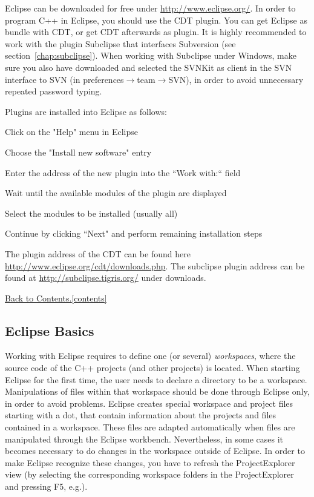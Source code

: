 \documentclass[11pt, oneside]{scrartcl}
\newcommand{\backtocontents}{\hyperref[contents]{Back to Contents.\ref*{contents}}}
\begin{document}
Eclipse can be downloaded for free under \url{http://www.eclipse.org/}. In order
to program C++ in Eclipse, you should use the CDT plugin. You can get Eclipse as
bundle with CDT, or get CDT afterwards as plugin. It is highly recommended to
work with the plugin Subclipse that interfaces Subversion (see
section~\ref{chap:subclipse}). When working with Subclipse under Windows, make
sure you also have downloaded and selected the SVNKit as client in the SVN
interface to SVN (in preferences$\rightarrow$team$\rightarrow$SVN), in order to 
avoid unnecessary repeated password typing.

Plugins are installed into Eclipse as follows:
\begin{enumerate*}
\item Click on the "Help" menu in Eclipse
\item Choose the "Install new software" entry
\item Enter the address of the new plugin into the ``Work with:`` field
\item Wait until the available modules of the plugin are displayed
\item Select the modules to be installed (usually all)
\item Continue by clicking ``Next" and perform remaining installation steps
\end{enumerate*}

\noindent The plugin address of the CDT can be found here
\url{http://www.eclipse.org/cdt/downloads.php}. The subclipse plugin address can
be found at \url{http://subclipse.tigris.org/} under downloads.
   
\backtocontents   
   
   
\subsection{Eclipse Basics}
    
Working with Eclipse requires to define one (or several) \textit{workspaces},
where the source code of the C++ projects (and other projects) is located. When
starting Eclipse for the first time, the user needs to declare a directory to be
a workspace. Manipulations of files within that workspace should be done through
Eclipse only, in order to avoid problems. Eclipse creates special workspace and
project files starting with a dot, that contain information about the projects
and files contained in a workspace. These files are adapted automatically when
files are manipulated through the Eclipse workbench. Nevertheless, in some cases
it becomes necessary to do changes in the workspace outside of Eclipse. In order
to make Eclipse recognize these changes, you have to refresh the ProjectExplorer
view (by selecting the corresponding workspace folders in the ProjectExplorer
and pressing F5, e.g.).
\end{document}
